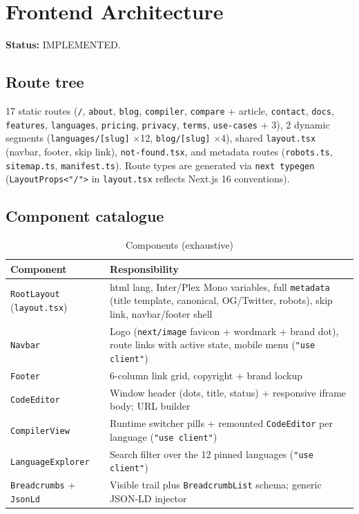 \section{Frontend Architecture}
\label{sec:frontend-architecture}

\textbf{Status:} IMPLEMENTED.

\subsection{Route tree}
17 static routes (\texttt{/}, \texttt{about}, \texttt{blog}, \texttt{compiler}, \texttt{compare} + article, \texttt{contact}, \texttt{docs}, \texttt{features}, \texttt{languages}, \texttt{pricing}, \texttt{privacy}, \texttt{terms}, \texttt{use-cases} + 3), 2 dynamic segments (\texttt{languages/[slug]} $\times$12, \texttt{blog/[slug]} $\times$4), shared \texttt{layout.tsx} (navbar, footer, skip link), \texttt{not-found.tsx}, and metadata routes (\texttt{robots.ts}, \texttt{sitemap.ts}, \texttt{manifest.ts}). Route types are generated via \texttt{next typegen} (\texttt{LayoutProps<"/">} in \texttt{layout.tsx} reflects Next.js 16 conventions).

\subsection{Component catalogue}
\begin{table}[H]
\centering
\caption{Components (exhaustive)}
\begin{tabular}{|l|p{8.5cm}|}
\hline
\textbf{Component} & \textbf{Responsibility} \\ \hline
\texttt{RootLayout} (\texttt{layout.tsx}) & html lang, Inter/Plex Mono variables, full \texttt{metadata} (title template, canonical, OG/Twitter, robots), skip link, navbar/footer shell \\ \hline
\texttt{Navbar} & Logo (\texttt{next/image} favicon + wordmark + brand dot), route links with active state, mobile menu (\texttt{"use client"}) \\ \hline
\texttt{Footer} & 6-column link grid, copyright + brand lockup \\ \hline
\texttt{CodeEditor} & Window header (dots, title, status) + responsive iframe body; URL builder \\ \hline
\texttt{CompilerView} & Runtime switcher pills + remounted \texttt{CodeEditor} per language (\texttt{"use client"}) \\ \hline
\texttt{LanguageExplorer} & Search filter over the 12 pinned languages (\texttt{"use client"}) \\ \hline
\texttt{Breadcrumbs} + \texttt{JsonLd} & Visible trail plus \texttt{BreadcrumbList} schema; generic JSON-LD injector \\ \hline
\end{tabular}
\end{table}

